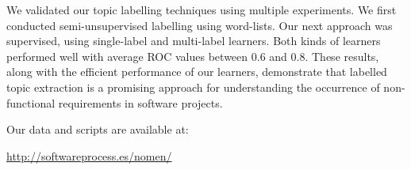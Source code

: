 \documentclass[smallextended]{svjour3}       %
\begin{document}
We validated our topic labelling techniques using multiple experiments. %
We first conducted semi-unsupervised labelling using word-lists. 
Our next approach was supervised, using single-label and multi-label learners. 
Both kinds of learners performed well with average
ROC values between $0.6$ and $0.8$. These results, along with the efficient performance of our learners, demonstrate that labelled topic extraction is
a promising approach for understanding the occurrence of non-functional requirements in software projects. 


Our data and scripts are available at:

\url{http://softwareprocess.es/nomen/}




\end{document}
